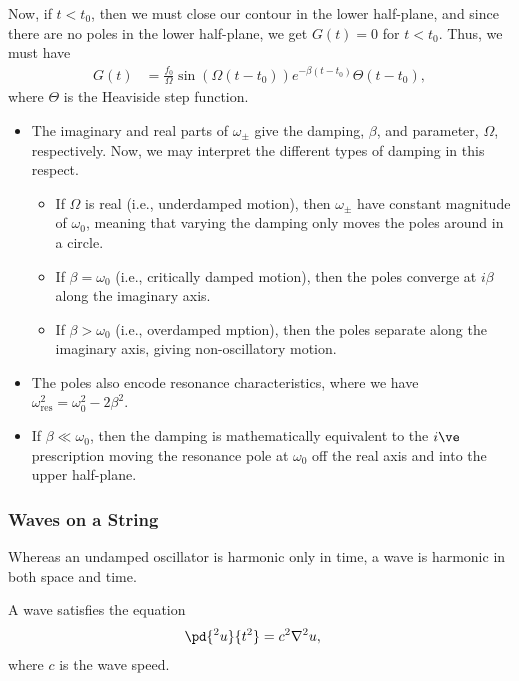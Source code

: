 \documentclass[10pt]{mypackage}
\begin{document}
  Now, if $t < t_0$, then we must close our contour in the lower half-plane, and since there are no poles in the lower half-plane, we get $G(t) = 0$ for $t < t_0$. Thus, we must have
  \begin{align*}
    G(t) &= \frac{f_0}{\Omega} \sin\left( \Omega\left( t-t_0 \right) \right)e^{-\beta\left( t-t_0 \right)}\Theta\left( t-t_0 \right),
  \end{align*}
  where $\Theta$ is the Heaviside step function.
  \begin{itemize}
    \item The imaginary and real parts of $\omega_{\pm}$ give the damping, $\beta$, and parameter, $\Omega$, respectively. Now, we may interpret the different types of damping in this respect.
      \begin{itemize}
        \item If $\Omega$ is real (i.e., underdamped motion), then $\omega_{\pm}$ have constant magnitude of $\omega_0$, meaning that varying the damping only moves the poles around in a circle.
        \item If $\beta = \omega_0$ (i.e., critically damped motion), then the poles converge at $i\beta$ along the imaginary axis.
        \item If $\beta > \omega_0$ (i.e., overdamped mption), then the poles separate along the imaginary axis, giving non-oscillatory motion.
      \end{itemize}
    \item The poles also encode resonance characteristics, where we have $\omega_{\text{res}}^2 = \omega_0^2 - 2\beta^2$.
    \item If $\beta \ll \omega_0$, then the damping is mathematically equivalent to the $i\ve$ prescription moving the resonance pole at $\omega_0$ off the real axis and into the upper half-plane.
  \end{itemize}
  \subsubsection{Waves on a String}%
  Whereas an undamped oscillator is harmonic only in time, a wave is harmonic in both space and time.\newline

  A wave satisfies the equation
  \begin{align*}
    \pd{^2u}{t^2} &= c^2\nabla^2 u,
  \end{align*}
  where $c$ is the wave speed.\newline
\end{document}
